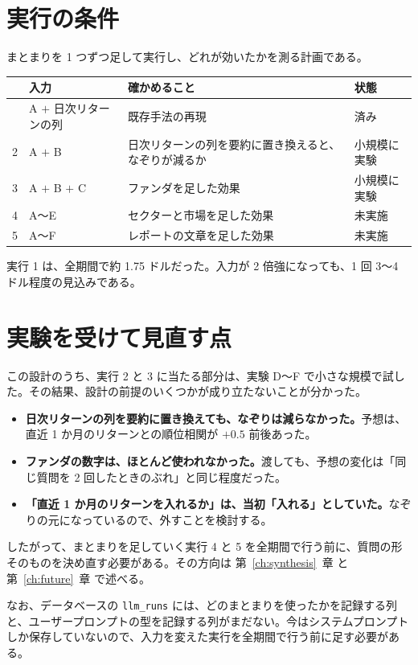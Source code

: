 \documentclass[xelatex,ja=standard,jafont=hiragino-pron,a4paper,10pt]{bxjsreport}
\newcommand{\code}[1]{\texttt{#1}}
\newcommand{\chapref}[1]{第~\ref{#1}~章}
\begin{document}
\section{実行の条件}

まとまりを 1 つずつ足して実行し、どれが効いたかを測る計画である。

\begin{longtable}{rp{4.20cm}p{7.00cm}p{2.20cm}}
\toprule
 & \textbf{入力} & \textbf{確かめること} & \textbf{状態} \\
\midrule
\endfirsthead
\bottomrule
\endfoot
1 & A $+$ 日次リターンの列 & 既存手法の再現 & 済み \\
2 & A $+$ B & 日次リターンの列を要約に置き換えると、なぞりが減るか & 小規模に実験 \\
3 & A $+$ B $+$ C & ファンダを足した効果 & 小規模に実験 \\
4 & A〜E & セクターと市場を足した効果 & 未実施 \\
5 & A〜F & レポートの文章を足した効果 & 未実施 \\
\end{longtable}

実行 1 は、全期間で約 1.75 ドルだった。入力が 2 倍強になっても、1 回 3〜4 ドル程度の見込みである。

\section{実験を受けて見直す点}

この設計のうち、実行 2 と 3 に当たる部分は、実験 D〜F で小さな規模で試した。その結果、設計の前提のいくつかが成り立たないことが分かった。

\begin{itemize}
\item \textbf{日次リターンの列を要約に置き換えても、なぞりは減らなかった。}予想は、直近 1 か月のリターンとの順位相関が $+0.5$ 前後あった。
\item \textbf{ファンダの数字は、ほとんど使われなかった。}渡しても、予想の変化は「同じ質問を 2 回したときのぶれ」と同じ程度だった。
\item \textbf{「直近 1 か月のリターンを入れるか」は、当初「入れる」としていた。}なぞりの元になっているので、外すことを検討する。
\end{itemize}

したがって、まとまりを足していく実行 4 と 5 を全期間で行う前に、質問の形そのものを決め直す必要がある。その方向は \chapref{ch:synthesis} と \chapref{ch:future} で述べる。

なお、データベースの \code{llm\_runs} には、どのまとまりを使ったかを記録する列と、ユーザープロンプトの型を記録する列がまだない。今はシステムプロンプトしか保存していないので、入力を変えた実行を全期間で行う前に足す必要がある。
\end{document}
